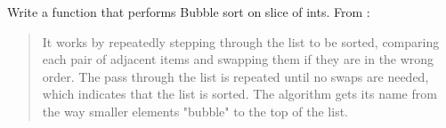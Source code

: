 \begin{Exercise}[title={Bubble sort},difficulty=5]
\label{ex:bubble}
\Question\label{ex:buble q1} Write a function that performs 
Bubble sort on slice of ints. From \cite{bubblesort}:
\begin{quote}
It works by repeatedly stepping through the list to be sorted, comparing each
pair of adjacent items and swapping them if they are in the wrong order. The
pass through the list is repeated until no swaps are needed, which indicates
that the list is sorted. The algorithm gets its name from the way smaller
elements "bubble" to the top of the list. 
\end{quote}

\end{Exercise}

\begin{Answer}
\Question 
\end{Answer}
